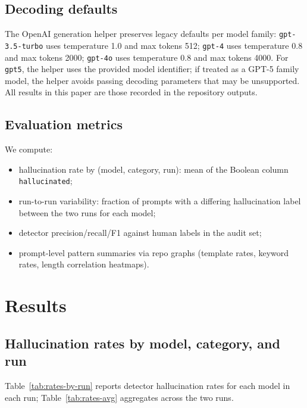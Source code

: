 \documentclass[11pt]{article}
\newcommand{\model}[1]{\texttt{#1}}
\begin{document}
\subsection{Decoding defaults}
The OpenAI generation helper preserves legacy defaults per model family: \model{gpt-3.5-turbo} uses temperature 1.0 and max tokens 512; \model{gpt-4} uses temperature 0.8 and max tokens 2000; \model{gpt-4o} uses temperature 0.8 and max tokens 4000. For \model{gpt5}, the helper uses the provided model identifier; if treated as a GPT-5 family model, the helper avoids passing decoding parameters that may be unsupported. All results in this paper are those recorded in the repository outputs.

\subsection{Evaluation metrics}
We compute:
\begin{itemize}[leftmargin=1.4em]
  \item hallucination rate by (model, category, run): mean of the Boolean column \texttt{hallucinated};
  \item run-to-run variability: fraction of prompts with a differing hallucination label between the two runs for each model;
  \item detector precision/recall/F1 against human labels in the audit set;
  \item prompt-level pattern summaries via repo graphs (template rates, keyword rates, length correlation heatmaps).
\end{itemize}

\section{Results}
\label{sec:results}

\subsection{Hallucination rates by model, category, and run}
Table~\ref{tab:rates-by-run} reports detector hallucination rates for each model in each run; Table~\ref{tab:rates-avg} aggregates across the two runs.
\end{document}
